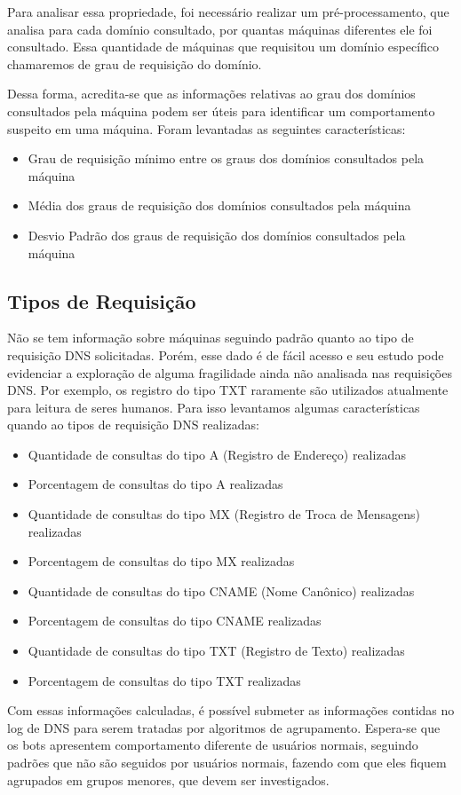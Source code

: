 Para analisar essa propriedade, foi necessário realizar um pré-processamento, que analisa para cada domínio consultado, por quantas máquinas diferentes ele foi consultado. Essa quantidade de máquinas que requisitou um domínio específico chamaremos de grau de requisição do domínio.

Dessa forma, acredita-se que as informações relativas ao grau dos domínios consultados pela máquina podem ser úteis para identificar um comportamento suspeito em uma máquina. Foram levantadas as seguintes características:

\begin{itemize}
\item Grau de requisição mínimo entre os graus dos domínios consultados pela máquina
\item Média dos graus de requisição dos domínios consultados pela máquina
\item Desvio Padrão dos graus de requisição dos domínios consultados pela máquina

\end{itemize}

\subsection{Tipos de Requisição}

Não se tem informação sobre máquinas seguindo padrão quanto ao tipo de requisição DNS solicitadas. Porém, esse dado é de fácil acesso e seu estudo pode evidenciar a exploração de alguma fragilidade ainda não analisada nas requisições DNS. Por exemplo, os registro do tipo TXT raramente são utilizados atualmente para leitura de seres humanos. Para isso levantamos algumas características quando ao tipos de requisição DNS realizadas:

\begin{itemize}
\item Quantidade de consultas do tipo A (Registro de Endereço) realizadas
\item Porcentagem de consultas do tipo A realizadas
\item Quantidade de consultas do tipo MX (Registro de Troca de Mensagens) realizadas
\item Porcentagem de consultas do tipo MX realizadas
\item Quantidade de consultas do tipo CNAME (Nome Canônico) realizadas
\item Porcentagem de consultas do tipo CNAME realizadas
\item Quantidade de consultas do tipo TXT (Registro de Texto) realizadas
\item Porcentagem de consultas do tipo TXT realizadas
\end{itemize}

Com essas informações calculadas, é possível submeter as informações contidas no log de DNS para serem tratadas por algoritmos de agrupamento. Espera-se que os bots apresentem comportamento diferente de usuários normais, seguindo padrões que não são seguidos por usuários normais, fazendo com que eles fiquem agrupados em grupos menores, que devem ser investigados.
